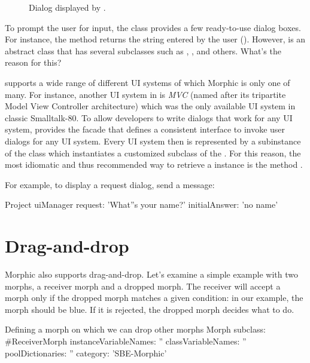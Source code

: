 \documentclass[a4paper,10pt,twoside]{book}
\begin{document}
\begin{figure}[htb]
\begin{minipage}{0.45\textwidth}
	\vfill
	\vspace{4ex}
	\caption{Dialog displayed by .}
\end{minipage}
\end{figure}

To prompt the user for input, the  class provides a few ready-to-use dialog boxes.
For instance, the  method returns the string entered by the user ().
However,  is an abstract class that has several subclasses such as , , and others.
What's the reason for this?

\sq supports a wide range of different UI systems of which Morphic is only one of many.
For instance, another UI system in \sq is \emph{MVC} (named after its tripartite Model View Controller architecture) which was the only available UI system in classic Smalltalk-80.
To allow developers to write dialogs that work for any UI system, \sq provides the  facade that defines a consistent interface to invoke user dialogs for any UI system.
Every UI system then is represented by a subinstance of the class  which instantiates a customized subclass of the .
For this reason, the most idiomatic and thus recommended way to retrieve a  instance is the method .

For example, to display a request dialog, send a  message:
\begin{code}{}
Project uiManager
	request: 'What''s your name?'
	initialAnswer: 'no name'
\end{code}

\section{Drag-and-drop}

Morphic also supports drag-and-drop. Let's examine a simple example with two morphs, a receiver morph and a dropped morph. 
The receiver will accept a morph only if the dropped morph matches a given condition: in our example,  the morph should be blue. If it is rejected, the dropped morph decides what to do.

\begin{classdef}{Defining a morph on which we can drop other morphs}
Morph subclass: #ReceiverMorph
	instanceVariableNames: ''
	classVariableNames: ''
	poolDictionaries: ''
	category: 'SBE-Morphic'
\end{classdef}
\end{document}
